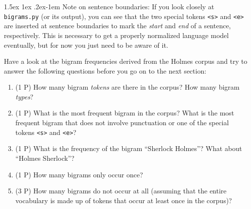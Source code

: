 \documentclass[11pt]{article}
\makeatletter
\renewcommand{\paragraph}{%
  \@startsection{paragraph}{4}%
  {\z@}{1.5ex \@plus 1ex \@minus .2ex}{-1em}%
  {\normalfont\normalsize\bfseries}%
}\makeatother
\makeatother
\begin{document}

\paragraph{Note on sentence boundaries:} If you look closely at {\tt
  bigrams.py} (or its output), you can see that the two special tokens
{\tt <s>} and {\tt <e>} are inserted at sentence boundaries to mark
the {\em start} and {\em end} of a sentence, respectively. This is
necessary to get a properly normalized language model eventually, but
for now you just need to be aware of it.

\vspace{0.3cm}
\noindent
Have a look at the bigram frequencies derived from the Holmes corpus
and try to answer the following questions before you go on to the next
section:
\begin{enumerate}
\item (1 P) How many bigram {\em tokens} are there in the corpus? %
How many bigram {\em types}? %
\item (1 P) What is the most frequent bigram in the corpus? %
What is the most frequent bigram that does not involve punctuation or one of the special tokens {\tt <s>} and {\tt <e>}? %
\item (1 P) What is the frequency of the bigram ``Sherlock Holmes''? %
What about ``Holmes Sherlock''? %
\item (1 P) How many bigrams only occur once? %
\item (3 P) How many bigrams do not occur at all (assuming that the entire vocabulary is made up of tokens that occur at least once in the corpus)?
\end{enumerate}
\end{document}
